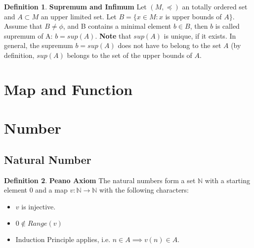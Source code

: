\documentclass{article}
\theoremstyle{definition}
\newtheorem{defi}{Definition}[section]
\begin{document}
\begin{defi}
\textbf{Supremum and Infimum} Let $(M, \preceq)$ an totally ordered set and $A\subset M$ an upper limited set. Let $B=\{x\in M: x $ is upper bounds of $A\}$. Assume that $B \neq \phi$, and B contains a minimal element $b \in B$, then $b$ is called supremum of A: $b = sup(A)$. \textbf{Note} that $sup(A)$ is unique, if it exists. In general, the supremum $b = sup(A)$ does not have to belong to the set $A$ (by definition, $sup(A)$ belongs to the set of the upper bounds of $A$.
\end{defi}

\section{Map and Function}

\section{Number}

\subsection{Natural Number}

\begin{defi}
\textbf{Peano Axiom} The natural numbers form a set $\mathbb{N}$ with a starting element $0$ and a map $v: \mathbb{N}\to \mathbb{N}$ with the following characters:

\begin{itemize}
    \item $v$ is injective.
    \item $0 \not\in Range(v)$
    \item Induction Principle applies, i.e. $n\in A \implies v(n) \in A$.
\end{itemize}
\end{defi}
\end{document}
